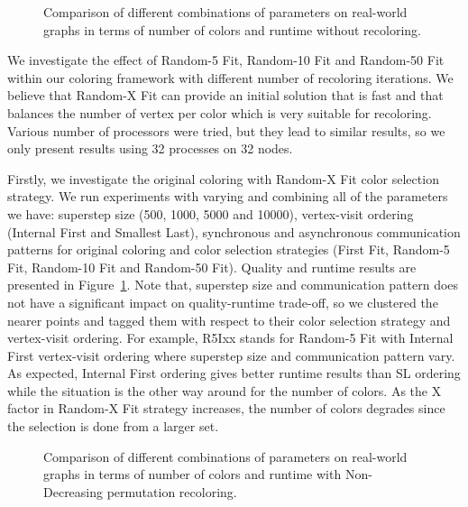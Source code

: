 \documentclass{article}
\begin{document}
\begin{figure}[tb]
  \centering
  \caption{Comparison of different combinations of parameters on real-world graphs in terms of number of colors and runtime
without recoloring.}
  \label{fig:random1}
\end{figure}

We investigate the effect of Random-5 Fit, Random-10 Fit and Random-50
Fit within our coloring framework with different number of recoloring
iterations. We believe that Random-X Fit can provide an initial
solution that is fast and that balances the number of vertex per color
which is very suitable for recoloring. Various number of processors
were tried, but they lead to similar results, so we only present
results using 32 processes on 32 nodes.

Firstly, we investigate the original coloring with Random-X Fit color
selection strategy. We run experiments with varying and combining all
of the parameters we have: superstep size (500, 1000, 5000 and 10000),
vertex-visit ordering (Internal First and Smallest Last), synchronous
and asynchronous communication patterns for original coloring and
color selection strategies (First Fit, Random-5 Fit, Random-10 Fit and
Random-50 Fit). Quality and runtime results are presented in
Figure~\ref{fig:random1}.  Note that, superstep size and communication
pattern does not have a significant impact on quality-runtime
trade-off, so we clustered the nearer points and tagged them with
respect to their color selection strategy and vertex-visit
ordering. For example, R5Ixx stands for Random-5 Fit with Internal
First vertex-visit ordering where superstep size and communication
pattern vary.  As expected, Internal First ordering gives better
runtime results than SL ordering while the situation is the other way
around for the number of colors. As the X factor in Random-X Fit
strategy increases, the number of colors degrades since the selection
is done from a larger set.

\begin{figure}[tbh!]
  \centering
  \caption{Comparison of different combinations of parameters on real-world graphs in terms of number of colors and runtime
with Non-Decreasing permutation recoloring.}
\end{figure}
\end{document}
